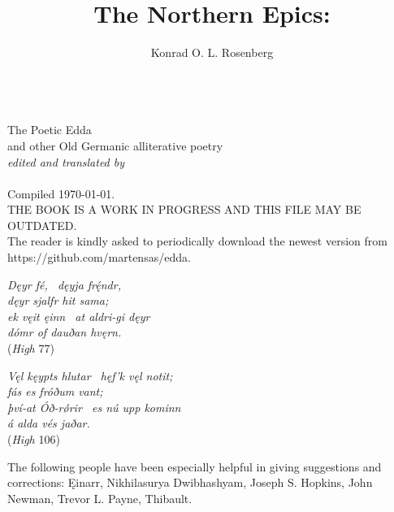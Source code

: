\title{The Northern Epics:}
\author{Konrad O. L. Rosenberg}

\begin{titlingpage}
  \makeatletter
  \centering
  \HUGE \textsc{\@title} \\
  \Huge The Poetic Edda \\
  \huge and other Old Germanic alliterative poetry \\
  \vspace{1cm}
  \Large\emph{edited and translated by} \\
  \vspace{1cm}
  \huge \@author \\
  \vspace{4cm}
  \Large Compiled \today. \\
  \vspace{1cm}
  THE BOOK IS A WORK IN PROGRESS AND THIS FILE MAY BE OUTDATED. \\
  The reader is kindly asked to periodically download the newest version from https://github.com/martensas/edda.
  \makeatother
\end{titlingpage}

\newpage\thispagestyle{empty}

\begin{center}{\Large \emph{Dęyr fé, \hld\ dęyja frę́ndr, \\
dęyr sjalfr hit sama; \\
ek vęit ęinn \hld\ at aldri-gi dęyr \\
dómr of dauðan hvęrn.}} \\

(\emph{High} 77)\end{center}

\vspace{5mm}

\begin{center}{\Large \emph{Vęl kęypts hlutar \hld\ hęf’k vęl notit; \\
fás es fróðum vant; \\
því-at Óð-rǿrir \hld\ es nú upp kominn \\
á alda vés jaðar.}} \\

(\emph{High} 106)\end{center}

\vspace{2cm}

The following people have been especially helpful in giving suggestions and corrections: Ęinarr, Nikhilasurya Dwibhashyam, Joseph S. Hopkins, John Newman, Trevor L. Payne, Thibault.

